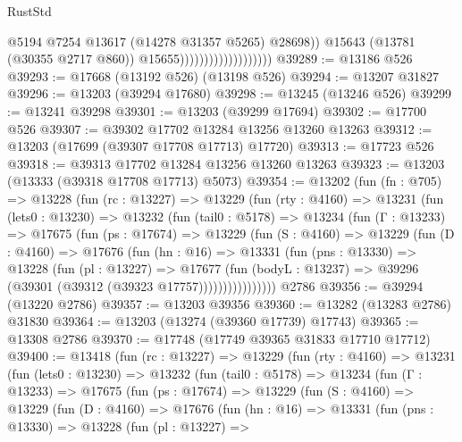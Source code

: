 \begin{lexlean}{RustStd}
\begin{coremodule}
                                              @5194
                                              @7254
                                              @13617
                                              (@14278 @31357 @5265)
                                              @28698))
                                          @15643
                                          (@13781 (@30355 @2717 @860))
                                          @15655)))))))))))))))))))
@39289 := @13186 @526
@39293 := @17668 (@13192 @526) (@13198 @526)
@39294 := @13207 @31827
@39296 := @13203 (@39294 @17680)
@39298 := @13245 (@13246 @526)
@39299 := @13241 @39298
@39301 := @13203 (@39299 @17694)
@39302 := @17700 @526
@39307 := @39302 @17702 @13284 @13256 @13260 @13263
@39312 := @13203 (@17699 (@39307 @17708 @17713) @17720)
@39313 := @17723 @526
@39318 := @39313 @17702 @13284 @13256 @13260 @13263
@39323 := @13203 (@13333 (@39318 @17708 @17713) @5073)
@39354 := @13202
    (fun (fn : @705) =>
    @13228
      (fun (rc : @13227) =>
      @13229
        (fun (rty : @4160) =>
        @13231
          (fun (lets0 : @13230) =>
          @13232
            (fun (tail0 : @5178) =>
            @13234
              (fun (Γ : @13233) =>
              @17675
                (fun (ps : @17674) =>
                @13229
                  (fun (S : @4160) =>
                  @13229
                    (fun (D : @4160) =>
                    @17676
                      (fun (hn : @16) =>
                      @13331
                        (fun (pns : @13330) =>
                        @13228
                          (fun (pl : @13227) =>
                          @17677
                            (fun (bodyL : @13237) =>
                            @39296 (@39301 (@39312 (@39323 @17757))))))))))))))))
    @2786
@39356 := @39294 (@13220 @2786)
@39357 := @13203 @39356
@39360 := @13282 (@13283 @2786) @31830
@39364 := @13203 (@13274 (@39360 @17739) @17743)
@39365 := @13308 @2786
@39370 := @17748 (@17749 @39365 @31833 @17710 @17712)
@39400 := @13418
    (fun (rc : @13227) =>
    @13229
      (fun (rty : @4160) =>
      @13231
        (fun (lets0 : @13230) =>
        @13232
          (fun (tail0 : @5178) =>
          @13234
            (fun (Γ : @13233) =>
            @17675
              (fun (ps : @17674) =>
              @13229
                (fun (S : @4160) =>
                @13229
                  (fun (D : @4160) =>
                  @17676
                    (fun (hn : @16) =>
                    @13331
                      (fun (pns : @13330) =>
                      @13228
                        (fun (pl : @13227) =>

\end{coremodule}
\end{lexlean}
